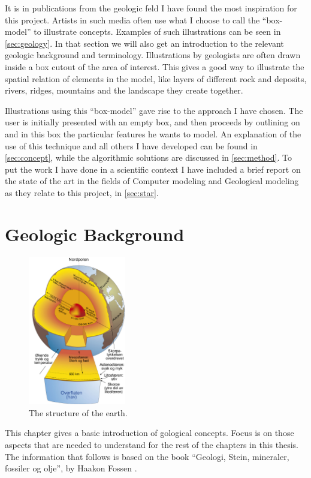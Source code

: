 \documentclass[a4paper,12pt]{report}
\newcommand{\secref}[1]{\autoref{#1}}
\begin{document}
It is in publications from the geologic feld I have found the most inspiration for this project. Artists in such media often use what I choose to call the ``box-model'' to illustrate concepts. Examples of such illustrations can be seen in \secref{sec:geology}. In that section we will also get an introduction to the relevant geologic background and terminology. Illustrations by geologists are often drawn inside a box cutout of the area of interest. This gives a good way to illustrate the spatial relation of elements in the model, like layers of different rock and deposits, rivers, ridges, mountains and the landscape they create together.

Illustrations using this ``box-model'' gave rise to the approach I have chosen. The user is initially presented with an empty box, and then proceeds by outlining on and in this box the particular features he wants to model. An explanation of the use of this technique and all others I have developed can be found in \secref{sec:concept}, while the algorithmic solutions are discussed in \secref{sec:method}. To put the work I have done in a scientific context I have included a brief report on the state of the art in the fields of Computer modeling and Geological modeling as they relate to this project, in \secref{sec:star}.
\clearpage


\chapter{Geologic Background}
\label{sec:geology}
\begin{figure}
  \begin{center}
    \includegraphics[width=0.38\textwidth]{thesis/geo/core.png}
  \end{center}
  \caption{The structure of the earth.}
  \label{fig:core}
\end{figure}
This chapter gives a basic introduction of gological concepts. Focus is on those aspects that are needed to understand for the rest of the chapters in this thesis. The information that follows is based on the book ``Geologi, Stein, mineraler, fossiler og olje'', by Haakon Fossen \cite{fossen2008geologi}. 
\end{document}

